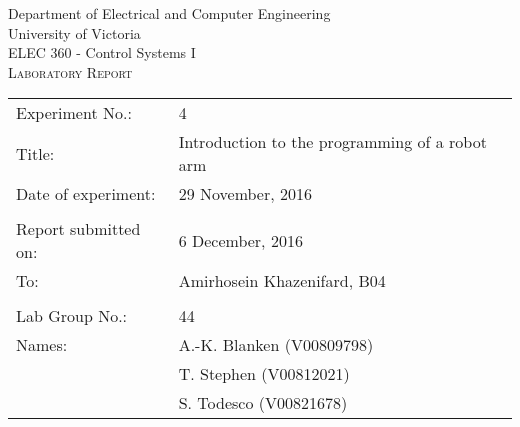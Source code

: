 \begin{titlepage}

\begin{center}
	\begin{LARGE}
		Department of Electrical and Computer Engineering \\
		University of Victoria \\
		ELEC 360 - Control Systems I \\[1cm]
		\textsc{Laboratory Report}
		\\[1cm]
	\end{LARGE}
\end{center}

\begin{tabular}{ p{} p{} }
	Experiment No.: & 4 \\ 
	Title: & Introduction to the programming of a robot arm \\ 
	Date of experiment:& 29 November, 2016 \\ 
	& \\
	Report submitted on:& 6 December, 2016 \\ 
	To: & Amirhosein Khazenifard, B04 \\ 
	& \\
  Lab Group No.: & 44 \\
	Names: & A.-K.
Blanken (V00809798)\\
	& T.
Stephen (V00812021) \\
  & S.
Todesco (V00821678)
\end{tabular}

\end{titlepage}
